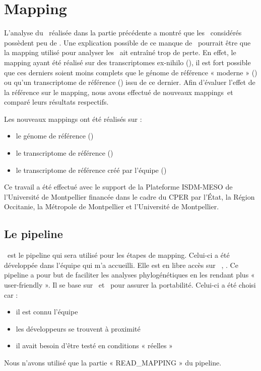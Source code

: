 \documentclass[../main]{subfiles} %
\begin{document}
\addto\extrasfrench{\protected\edef:{\unexpanded\expandafter{:}}}

\section{Mapping}
\label{sec:Mapping}
L’analyse du \NbSNP réalisée dans la partie précédente a montré que les \contigs considérés possèdent peu de \SNP. Une explication possible de  ce manque de \SNP pourrait être que la \gls{mapping} utilisé pour analyser les \contigs ait entraîné trop de perte. En effet, le \gls{mapping} ayant été réalisé sur des transcriptomes ex-nihilo (\TrEx), il est fort possible que ces derniers soient moins complets que le génome de référence « moderne »  (\GeMo) ou qu’un transcriptome de référence (\TrMo) issu de ce dernier. Afin d’évaluer l’effet de la référence sur le \gls{mapping}, nous avons effectué de nouveaux \glspl{mapping} et comparé leurs résultats respectifs.

Les nouveaux  \glspl{mapping} ont été réalisés sur :
\begin{itemize}
\item le génome de référence (\GeMo)
\item le transcriptome de référence (\TrMo)
\item le transcriptome de référence créé par l'équipe (\TrEx)
\end{itemize}

Ce travail a été effectué avec le support de la Plateforme ISDM-MESO de l’Université de Montpellier financée dans le cadre du CPER par l’État, la Région Occitanie, la Métropole de Montpellier et l’Université de Montpellier.




\subsection{Le pipeline}
\label{sec:GeCKO}
\GeCKO est le pipeline qui sera utilisé pour les étapes de \gls{mapping}. Celui-ci a été développée dans l’équipe qui m’a accueilli. Elle est en libre accès sur \GitHub \cite{noauthor_ge2popgecko_2024}, \cite{ardisson_gecko_2024}. Ce pipeline a pour but de faciliter les analyses phylogénétiques en les rendant plus « user-friendly ». Il se base sur \Conda et \SnakeMake pour assurer la portabilité. Celui-ci a été choisi car :
\begin{itemize}
\item il est connu l’équipe
\item les développeurs se trouvent à proximité
\item il avait besoin d’être testé en conditions « réelles »
\end{itemize}
Nous n’avons utilisé que la partie « READ\_MAPPING » du pipeline.
\end{document}
